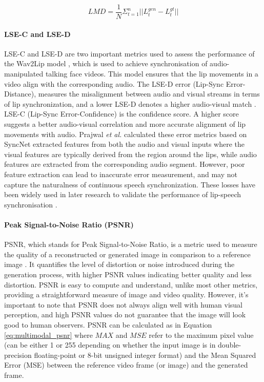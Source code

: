 \begin{equation}
    LMD = \frac{1}{N} \Sigma_{t=1}^n ||L_t^{gen} - L_t^{gt}||
    \label{eq:multimodal_lmd}
\end{equation}

\paragraph{LSE-C and LSE-D}

LSE-C and LSE-D are two important metrics used to assess the performance of the Wav2Lip model \cite{prajwal2020lip}, which is used to achieve synchronisation of audio-manipulated talking face videos. This model ensures that the lip movements in a video align with the corresponding audio. The LSE-D error (Lip-Sync Error-Distance), measures the misalignment between audio and visual streams in terms of lip synchronization, and a lower LSE-D denotes a higher audio-visual match \cite{prajwal2020lip}. LSE-C (Lip-Sync Error-Confidence) is the confidence score. A higher score suggests a better audio-visual correlation and more accurate alignment of lip movements with audio. Prajwal \textit{et al.} calculated these error metrics based on SyncNet \cite{chung2017out} extracted features from both the audio and visual inputs where the visual features are typically derived from the region around the lips, while audio features are extracted from the corresponding audio segment. However, poor feature extraction can lead to inaccurate error measurement, and may not capture the naturalness of continuous speech synchronization. These losses have been widely used in later research to validate the performance of lip-speech synchronisation \cite{wang2022attention, zhang2022meta, lu2022visualtts}. 

\paragraph{Peak Signal-to-Noise Ratio (PSNR)}

PSNR, which stands for Peak Signal-to-Noise Ratio, is a metric used to measure the quality of a reconstructed or generated image in comparison to a reference image \cite{huang2020fakeretouch, huang2020fakepolisher, wang2021faketagger}. It quantifies the level of distortion or noise introduced during the generation process, with higher PSNR values indicating better quality and less distortion. PSNR is easy to compute and understand, unlike most other metrics, providing a straightforward measure of image and video quality. However, it's important to note that PSNR does not always align well with human visual perception, and high PSNR values do not guarantee that the image will look good to human observers. PSNR can be calculated as in Equation \ref{eq:multimodal_psnr} where $MAX$ and $MSE$ refer to the maximum pixel value (can be either 1 or 255 depending on whether the input image is in double-precision floating-point or 8-bit unsigned integer format) and the Mean Squared Error (MSE) between the reference video frame (or image) and the generated frame.

